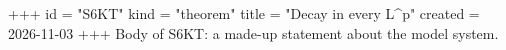 +++
id = "S6KT"
kind = "theorem"
title = "Decay in every L^p"
created = 2026-11-03
+++
Body of S6KT: a made-up statement about the model system.
